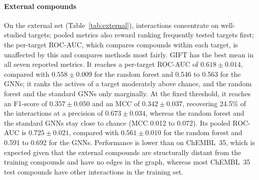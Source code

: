 \documentclass[11pt,letterpaper]{article}
\begin{document}
\paragraph{External compounds}
On the external set (Table~\ref{tab:external}), interactions concentrate on well-studied targets; pooled metrics also reward ranking frequently tested targets first; the per-target ROC-AUC, which compares compounds within each target, is unaffected by this and compares methods most fairly. GIFT has the best mean in all seven reported metrics. It reaches a per-target ROC-AUC of $0.618\pm0.014$, compared with $0.558\pm0.009$ for the random forest and 0.546 to 0.563 for the GNNs; it ranks the actives of a target moderately above chance, and the random forest and the standard GNNs only marginally. At the fixed threshold, it reaches an F1-score of $0.357\pm0.050$ and an MCC of $0.342\pm0.037$, recovering 24.5\% of the interactions at a precision of $0.673\pm0.034$, whereas the random forest and the standard GNNs stay close to chance (MCC 0.012 to 0.072). Its pooled ROC-AUC is $0.725\pm0.021$, compared with $0.561\pm0.010$ for the random forest and 0.591 to 0.692 for the GNNs. Performance is lower than on ChEMBL~35, which is expected given that the external compounds are structurally distant from the training compounds and have no edges in the graph, whereas most ChEMBL~35 test compounds have other interactions in the training set.
\end{document}
